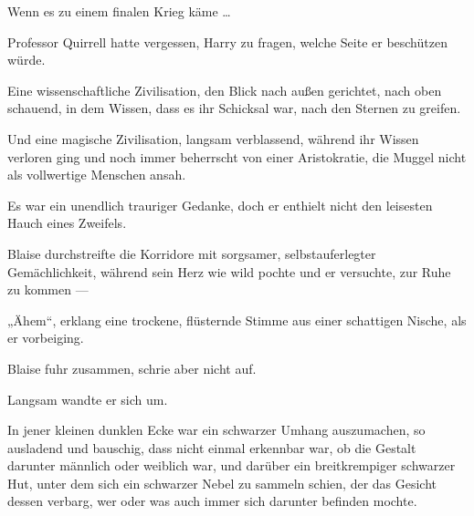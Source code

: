 Wenn es zu einem finalen Krieg käme …

Professor Quirrell hatte vergessen, Harry zu fragen, welche Seite er beschützen würde.

Eine wissenschaftliche Zivilisation, den Blick nach außen gerichtet, nach oben schauend, in dem Wissen, dass es ihr Schicksal war, nach den Sternen zu greifen.

Und eine magische Zivilisation, langsam verblassend, während ihr Wissen verloren ging und noch immer beherrscht von einer Aristokratie, die Muggel nicht als vollwertige Menschen ansah.

Es war ein unendlich trauriger Gedanke, doch er enthielt nicht den leisesten Hauch eines Zweifels.


Blaise durchstreifte die Korridore mit sorgsamer, selbstauferlegter Gemächlichkeit, während sein Herz wie wild pochte und er versuchte, zur Ruhe zu kommen —

„Ähem“, erklang eine trockene, flüsternde Stimme aus einer schattigen Nische, als er vorbeiging.

Blaise fuhr zusammen, schrie aber nicht auf.

Langsam wandte er sich um.

In jener kleinen dunklen Ecke war ein schwarzer Umhang auszumachen, so ausladend und bauschig, dass nicht einmal erkennbar war, ob die Gestalt darunter männlich oder weiblich war, und darüber ein breitkrempiger schwarzer Hut, unter dem sich ein schwarzer Nebel zu sammeln schien, der das Gesicht dessen verbarg, wer oder was auch immer sich darunter befinden mochte.

